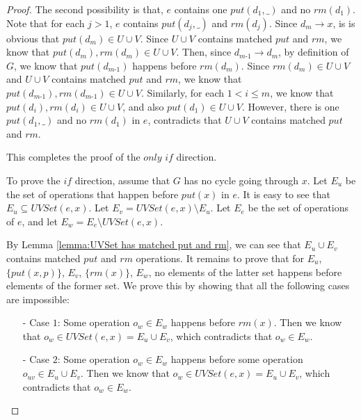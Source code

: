 \begin {proof}
The second possibility is that, $e$ contains one $\textit{put}(d_1,\_)$ and no $\textit{rm}(d_1)$. Note that for each $j > 1$, $e$ contains $\textit{put}(d_j,\_)$ and $\textit{rm}(d_j)$. Since $d_m \rightarrow x$, is is obvious that $\textit{put}(d_m) \in U \cup V$. Since $U \cup V$ contains matched $\textit{put}$ and $\textit{rm}$, we know that $\textit{put}(d_m),\textit{rm}(d_m) \in U \cup V$. Then, since $d_{\textit{m-1}} \rightarrow d_m$, by definition of $G$, we know that $\textit{put}(d_{\textit{m-1}})$ happens before $\textit{rm}(d_m)$. Since $\textit{rm}(d_m) \in U \cup V$ and $U \cup V$ contains matched $\textit{put}$ and $\textit{rm}$, we know that $\textit{put}(d_{\textit{m-1}}),\textit{rm}(d_{\textit{m-1}}) \in U \cup V$. Similarly, for each $1 < i \leq m$, we know that $\textit{put}(d_i),\textit{rm}(d_i) \in U \cup V$, and also $\textit{put}(d_1)\in U \cup V$. However, there is one $\textit{put}(d_1,\_)$ and no $\textit{rm}(d_1)$ in $e$, contradicts that $U \cup V$ contains matched $\textit{put}$ and $\textit{rm}$.

This completes the proof of the $\textit{only if}$ direction.

To prove the $\textit{if}$ direction, assume that $G$ has no cycle going through $x$. Let $E_u$ be the set of operations that happen before $\textit{put}(x)$ in $e$. It is easy to see that $E_u \subseteq \textit{UVSet}(e,x)$. Let $E_v = \textit{UVSet}(e,x) \setminus E_u$. Let $E_e$ be the set of operations of $e$, and let $E_w = E_e \setminus \textit{UVSet}(e,x)$.

By Lemma \ref{lemma:UVSet has matched put and rm}, we can see that $E_u \cup E_v$ contains matched $\textit{put}$ and $\textit{rm}$ operations. It remains to prove that for $E_u$, $\{ \textit{put}(x,p) \}$, $E_v$, $\{ \textit{rm}(x) \}$, $E_w$, no elements of the latter set happens before elements of the former set. We prove this by showing that all the following cases are impossible:

\begin{itemize}
\setlength{\itemsep}{0.5pt}
\item[-] Case $1$: Some operation $o_w \in E_w$ happens before $\textit{rm}(x)$. Then we know that $o_w \in \textit{UVSet}(e,x) = E_u \cup E_v$, which contradicts that $o_w \in E_w$.

\item[-] Case $2$: Some operation $o_w \in E_w$ happens before some operation $o_{\textit{uv}} \in E_u \cup E_v$. Then we know that $o_w \in \textit{UVSet}(e,x) = E_u \cup E_v$, which contradicts that $o_w \in E_w$.


\end{itemize}
\end{proof}
